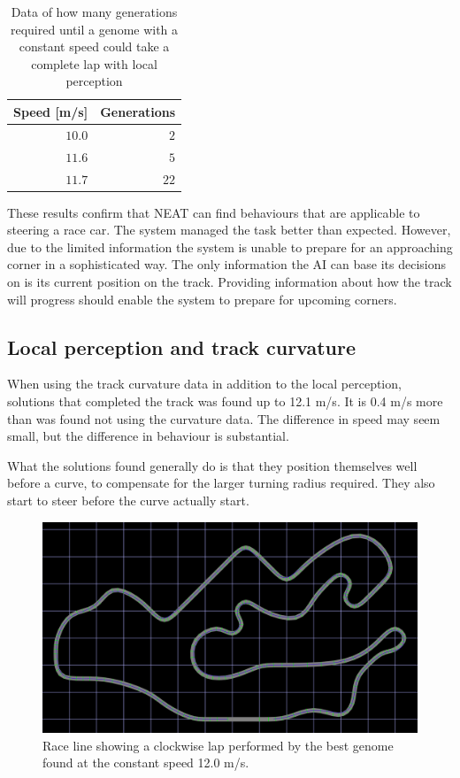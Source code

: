 \begin{table}[h!] 
  \centering
  \begin{tabular}{rr}
    \toprule
    Speed [m/s] & Generations\\
    \midrule
    $10.0$ & $2$ \\
    $11.6$ & $5$ \\
    $11.7$ & $22$ \\
    \bottomrule
  \end{tabular}
  \caption{Data of how many generations required until a genome with a constant speed could take a complete lap with local perception}
  \label{tab:localdata}
\end{table}

\noindent
These results confirm that NEAT can find behaviours that are applicable to steering a race car. The system managed the task better than expected. However, due to the limited information the system is unable to prepare for an approaching corner in a sophisticated way. The only information the AI can base its decisions on is its current position on the track. Providing information about how the track will progress should enable the system to prepare for upcoming corners. 


\subsection{Local perception and track curvature}
\label{subsec:fixedspeedcurvature}

When using the track curvature data in addition to the local perception, solutions that completed the track was found up to 12.1 m/s. It is 0.4 m/s more than was found not using the curvature data. The difference in speed may seem small, but the difference in behaviour is substantial.

What the solutions found generally do is that they position themselves well before a curve, to compensate for the larger turning radius required. They also start to steer before the curve actually start.

\begin{figure}[H]
\includegraphics[width=\textwidth]{report/images/fixed_curve_data}
\centering
\caption{Race line showing a clockwise lap performed by the best genome found at the constant speed 12.0 m/s.}
\label{fig:constantspeedline}
\end{figure}


